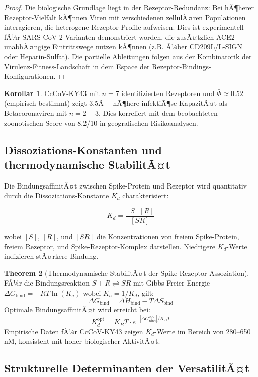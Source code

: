 ﻿\documentclass[11pt,a4paper]{article}
\theoremstyle{definition}
\newtheorem{theorem}{Theorem}[section]
\newtheorem{corollary}[theorem]{Korollar}
\begin{document}
\begin{proof}
Die biologische Grundlage liegt in der Rezeptor-Redundanz: Bei hÃ¶herer Rezeptor-Vielfalt kÃ¶nnen Viren mit verschiedenen zellulÃ¤ren Populationen interagieren, die heterogene Rezeptor-Profile aufweisen. Dies ist experimentell fÃ¼r SARS-CoV-2 Varianten demonstriert worden, die zusÃ¤tzlich ACE2-unabhÃ¤ngige Eintrittswege nutzen kÃ¶nnen (z.B. Ã¼ber CD209L/L-SIGN oder Heparin-Sulfat). Die partielle Ableitungen folgen aus der Kombinatorik der Virulenz-Fitness-Landschaft in dem Espace der Rezeptor-Bindings-Konfigurationen.
\end{proof}

\begin{corollary}
CcCoV-KY43 mit $n = 7$ identifizierten Rezeptoren und $\bar{\Phi} \approx 0.52$ (empirisch bestimmt) zeigt 3.5Ã— hÃ¶here infektiÃ¶se KapazitÃ¤t als Betacoronaviren mit $n = 2-3$. Dies korreliert mit dem beobachteten zoonotischen Score von 8.2/10 in geografischen Risikoanalysen.
\end{corollary}

\subsection{Dissoziations-Konstanten und thermodynamische StabilitÃ¤t}

Die BindungsaffinitÃ¤t zwischen Spike-Protein und Rezeptor wird quantitativ durch die Dissoziations-Konstante $K_d$ charakterisiert:

\[
K_d = \frac{[S] [R]}{[SR]}
\]

wobei $[S]$, $[R]$, und $[SR]$ die Konzentrationen von freiem Spike-Protein, freiem Rezeptor, und Spike-Rezeptor-Komplex darstellen. Niedrigere $K_d$-Werte indizieren stÃ¤rkere Bindung.

\begin{theorem}[Thermodynamische StabilitÃ¤t der Spike-Rezeptor-Assoziation]
FÃ¼r die Bindungsreaktion $S + R \rightleftharpoons SR$ mit Gibbs-Freier Energie $\Delta G_{\text{bind}} = -RT \ln(K_a)$ wobei $K_a = 1/K_d$, gilt:
\[
\Delta G_{\text{bind}} = \Delta H_{\text{bind}} - T \Delta S_{\text{bind}}
\]
Optimale BindungsaffinitÃ¤t wird erreicht bei:
\[
K_d^{\text{opt}} = K_B T \cdot e^{-|\Delta G_{\text{bind}}^{\text{opt}}|/K_B T}
\]
Empirische Daten fÃ¼r CcCoV-KY43 zeigen $K_d$-Werte im Bereich von 280--650 nM, konsistent mit hoher biologischer AktivitÃ¤t.
\end{theorem}

\subsection{Strukturelle Determinanten der VersatilitÃ¤t}
\end{document}
